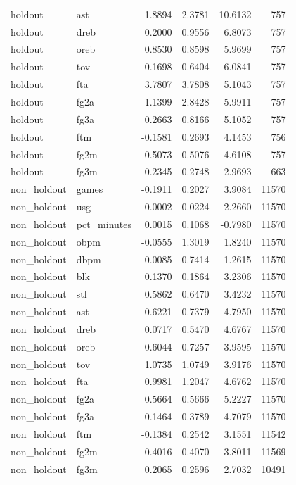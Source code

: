 \begin{table}
\begin{tabular}{llrrrr}
holdout & ast & 1.8894 & 2.3781 & 10.6132 & 757 \\
holdout & dreb & 0.2000 & 0.9556 & 6.8073 & 757 \\
holdout & oreb & 0.8530 & 0.8598 & 5.9699 & 757 \\
holdout & tov & 0.1698 & 0.6404 & 6.0841 & 757 \\
holdout & fta & 3.7807 & 3.7808 & 5.1043 & 757 \\
holdout & fg2a & 1.1399 & 2.8428 & 5.9911 & 757 \\
holdout & fg3a & 0.2663 & 0.8166 & 5.1052 & 757 \\
holdout & ftm & -0.1581 & 0.2693 & 4.1453 & 756 \\
holdout & fg2m & 0.5073 & 0.5076 & 4.6108 & 757 \\
holdout & fg3m & 0.2345 & 0.2748 & 2.9693 & 663 \\
non\_holdout & games & -0.1911 & 0.2027 & 3.9084 & 11570 \\
non\_holdout & usg & 0.0002 & 0.0224 & -2.2660 & 11570 \\
non\_holdout & pct\_minutes & 0.0015 & 0.1068 & -0.7980 & 11570 \\
non\_holdout & obpm & -0.0555 & 1.3019 & 1.8240 & 11570 \\
non\_holdout & dbpm & 0.0085 & 0.7414 & 1.2615 & 11570 \\
non\_holdout & blk & 0.1370 & 0.1864 & 3.2306 & 11570 \\
non\_holdout & stl & 0.5862 & 0.6470 & 3.4232 & 11570 \\
non\_holdout & ast & 0.6221 & 0.7379 & 4.7950 & 11570 \\
non\_holdout & dreb & 0.0717 & 0.5470 & 4.6767 & 11570 \\
non\_holdout & oreb & 0.6044 & 0.7257 & 3.9595 & 11570 \\
non\_holdout & tov & 1.0735 & 1.0749 & 3.9176 & 11570 \\
non\_holdout & fta & 0.9981 & 1.2047 & 4.6762 & 11570 \\
non\_holdout & fg2a & 0.5664 & 0.5666 & 5.2227 & 11570 \\
non\_holdout & fg3a & 0.1464 & 0.3789 & 4.7079 & 11570 \\
non\_holdout & ftm & -0.1384 & 0.2542 & 3.1551 & 11542 \\
non\_holdout & fg2m & 0.4016 & 0.4070 & 3.8011 & 11569 \\
non\_holdout & fg3m & 0.2065 & 0.2596 & 2.7032 & 10491 \\
\bottomrule
\end{tabular}
\end{table}
